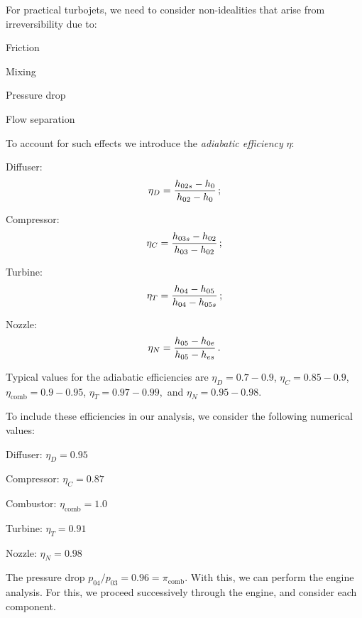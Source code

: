 For practical turbojets, we need to consider non-idealities that arise from irreversibility due to:
\begin{itemizePacked}
\item Friction
\item Mixing
\item Pressure drop
\item Flow separation
\end{itemizePacked}
To account for such effects we introduce the {\it adiabatic efficiency} $\eta$:
\begin{itemizePacked}
\item Diffuser: 
\begin{equation}
  \eta_D = {\frac{h_{02s}-h_{0}}{h_{02}-h_{0}}}\,;
\end{equation}
\item Compressor:
\begin{equation}
  \eta_C = {\frac{h_{03s}-h_{02}}{h_{03}-h_{02}}}\,;
\end{equation}
\item Turbine:
\begin{equation}
  \eta_T = {\frac{h_{04}-h_{05}}{h_{04}-h_{05s}}}\,;
\end{equation}
\item Nozzle:
\begin{equation}
  \eta_N = {\frac{h_{05}-h_{0e}}{h_{05}-h_{es}}}\,.
\end{equation}
\end{itemizePacked}
Typical values for the adiabatic efficiencies are $\eta_D = 0.7-0.9$, $\eta_C = 0.85-0.9$, $\eta_\text{comb} = 0.9-0.95$, $\eta_T = 0.97-0.99,$ and $\eta_N = 0.95-0.98.$

To include these efficiencies in our analysis, we consider the following numerical values:
\begin{itemizePacked}
\item Diffuser: $\eta_D = 0.95$
\item Compressor: $\eta_C = 0.87$
\item Combustor: $\eta_\text{comb} = 1.0$
\item Turbine: $\eta_T = 0.91$
\item Nozzle: $\eta_N = 0.98$
\end{itemizePacked}
The pressure drop $p_{04}/p_{03} = 0.96 = \pi_\text{comb}$. With this, we can perform the engine analysis. For this, we proceed successively through the engine, and consider each component.

